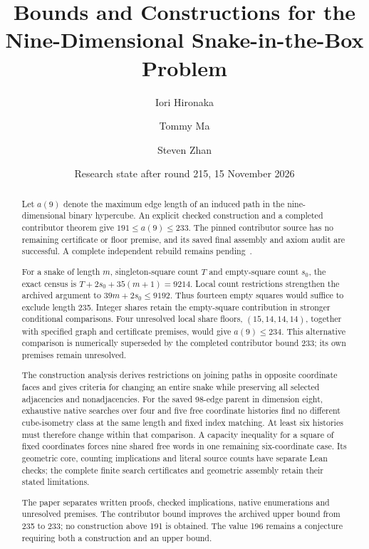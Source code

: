 \documentclass[11pt,a4paper]{article}
\title{Bounds and Constructions for the\\
Nine-Dimensional Snake-in-the-Box Problem}
\author{Iori Hironaka \and Tommy Ma \and Steven Zhan}
\date{Research state after round 215, 15 November 2026}
\theoremstyle{definition}
\theoremstyle{remark}
\begin{document}
\maketitle
\begin{abstract}
Let $a(9)$ denote the maximum edge length of an induced path in the
nine-dimensional binary hypercube. An explicit checked construction and
a completed contributor theorem give $191\le a(9)\le233$.
The pinned contributor source has no remaining certificate or floor
premise, and its saved final assembly and axiom audit are successful.
A complete independent rebuild remains pending~\cite{bound233archive}.

For a snake of length $m$, singleton-square count $T$ and empty-square
count $s_0$, the exact census is $T+2s_0+35(m+1)=9214$.
Local count restrictions strengthen the archived argument to
$39m+2s_0\le9192$. Thus fourteen empty squares would suffice to exclude
length 235. Integer shares retain the empty-square contribution in
stronger conditional comparisons. Four unresolved local share floors,
$(15,14,14,14)$, together with specified graph and certificate premises,
would give $a(9)\le234$. This alternative comparison is numerically
superseded by the completed contributor bound 233; its own premises
remain unresolved.

The construction analysis derives restrictions on joining paths in
opposite coordinate faces and gives criteria for changing an entire
snake while preserving all selected adjacencies and nonadjacencies.
For the saved 98-edge parent in dimension eight, exhaustive native
searches over four and five free coordinate histories find no different
cube-isometry class at the same length and fixed index matching.
At least six histories must therefore change within that comparison.
A capacity inequality for a square of fixed coordinates forces nine
shared free words in one remaining six-coordinate case. Its geometric
core, counting implications and literal source counts have separate
Lean checks; the complete finite search certificates and geometric
assembly retain their stated limitations.

The paper separates written proofs, checked implications, native
enumerations and unresolved premises. The contributor bound improves
the archived upper bound from 235 to 233; no construction above 191
is obtained. The value 196
remains a conjecture requiring both a construction and an upper bound.
\end{abstract}

\clearpage
\setcounter{tocdepth}{1}
\tableofcontents
\clearpage
\end{document}
